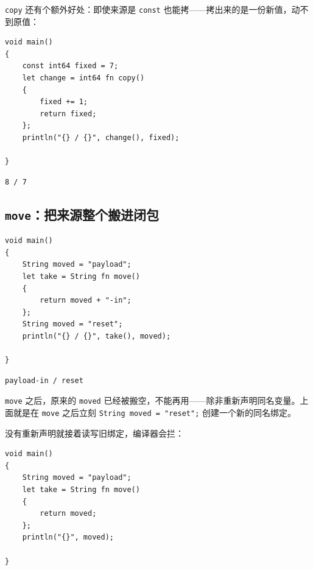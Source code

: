 \texttt{copy} 还有个额外好处：即使来源是 \texttt{const} 也能拷——拷出来的是一份新值，动不到原值：

\par
\medskip
\begin{lstlisting}[style=chali]
void main()
{
    const int64 fixed = 7;
    let change = int64 fn copy()
    {
        fixed += 1;
        return fixed;
    };
    println("{} / {}", change(), fixed);

}
\end{lstlisting}
\par
\medskip

\par
\medskip
\begin{lstlisting}[style=out]
8 / 7
\end{lstlisting}
\par
\medskip

\subsection{\texttt{move}：把来源整个搬进闭包}

\par
\medskip
\begin{lstlisting}[style=chali]
void main()
{
    String moved = "payload";
    let take = String fn move()
    {
        return moved + "-in";
    };
    String moved = "reset";
    println("{} / {}", take(), moved);

}
\end{lstlisting}
\par
\medskip

\par
\medskip
\begin{lstlisting}[style=out]
payload-in / reset
\end{lstlisting}
\par
\medskip

\texttt{move} 之后，原来的 \texttt{moved} 已经被搬空，不能再用——除非重新声明同名变量。上面就是在 \texttt{move} 之后立刻 \texttt{String moved =\allowbreak{} "reset";} 创建一个新的同名绑定。

没有重新声明就接着读写旧绑定，编译器会拦：

\par
\medskip
\begin{lstlisting}[style=chali]
void main()
{
    String moved = "payload";
    let take = String fn move()
    {
        return moved;
    };
    println("{}", moved);

}
\end{lstlisting}
\par
\medskip

